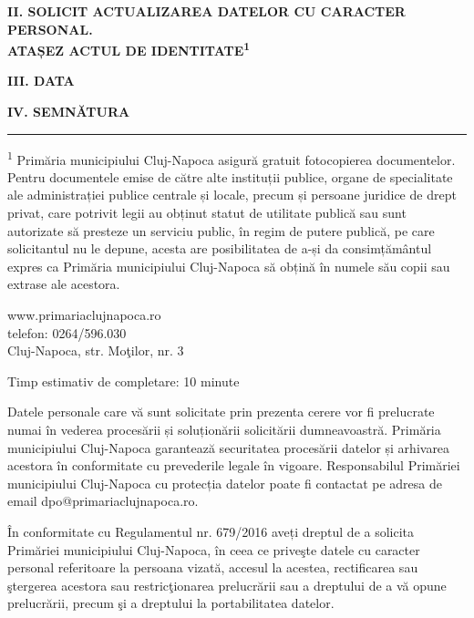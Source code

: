 \documentclass[11pt,a4paper]{article}
\begin{document}
\textbf{II. SOLICIT ACTUALIZAREA DATELOR CU CARACTER PERSONAL.}\\
\textbf{ATAȘEZ ACTUL DE IDENTITATE\textsuperscript{1}}

\vspace{0.6cm}

\textbf{III. DATA}\\
\hrulefill

\vspace{0.6cm}

\textbf{IV. SEMNĂTURA}\\
\hrulefill

\vspace{1cm}

\hrule

\vspace{0.3cm}

\footnotesize
\textsuperscript{1} Primăria municipiului Cluj-Napoca asigură gratuit fotocopierea documentelor.\\
Pentru documentele emise de către alte instituții publice, organe de specialitate ale administrației publice centrale și locale, precum și persoane juridice de drept privat, care potrivit legii au obținut statut de utilitate publică sau sunt autorizate să presteze un serviciu public, în regim de putere publică, pe care solicitantul nu le depune, acesta are posibilitatea de a-și da consimțământul expres ca Primăria municipiului Cluj-Napoca să obțină în numele său copii sau extrase ale acestora.

\vspace{0.4cm}

www.primariaclujnapoca.ro\\
telefon: 0264/596.030\\
Cluj-Napoca, str. Moţilor, nr. 3

\vspace{0.3cm}

Timp estimativ de completare: 10 minute

\vspace{0.2cm}

Datele personale care vă sunt solicitate prin prezenta cerere vor fi prelucrate numai în vederea procesării și soluționării solicitării dumneavoastră. Primăria municipiului Cluj-Napoca garantează securitatea procesării datelor și arhivarea acestora în conformitate cu prevederile legale în vigoare. Responsabilul Primăriei municipiului Cluj-Napoca cu protecția datelor poate fi contactat pe adresa de email dpo@primariaclujnapoca.ro.

În conformitate cu Regulamentul nr. 679/2016 aveți dreptul de a solicita Primăriei municipiului Cluj-Napoca, în ceea ce priveşte datele cu caracter personal referitoare la persoana vizată, accesul la acestea, rectificarea sau ştergerea acestora sau restricţionarea prelucrării sau a dreptului de a vă opune prelucrării, precum şi a dreptului la portabilitatea datelor.
\end{document}
